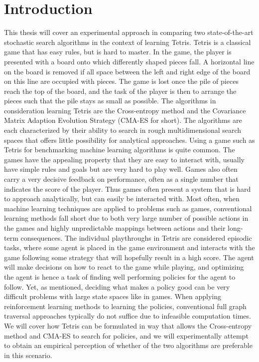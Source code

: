 \section{Introduction \label{sec:intro}}

This thesis will cover an experimental approach 
in comparing two state-of-the-art stochastic search
algorithms in the context of learning Tetris. 
Tetris is a classical game that has easy rules, but
is hard to master. In the game, the player is presented with
a board onto which differently shaped pieces fall. 
A horizontal line on the board is removed if all space between
the left and right edge of the board on this line are occupied with pieces.
The game is lost once the pile of pieces reach the top of the board,
and the task of the player is then to arrange the pieces such that
the pile stays as small as possible. 
The algorithms in consideration learning Tetris
are the Cross-entropy method and 
the Covariance Matrix Adaption Evolution Strategy (CMA-ES
for short). The algorithms are each characterized by their
ability to search in rough multidimensional 
search spaces that offers little possibility 
for analytical approaches.
Using a game such as Tetris for benchmarking machine learning
algorithms is quite common. The games have the appealing property 
that they are easy to interact with, usually have simple rules and 
goals but are very hard to play well. Games also often carry
a very decisive feedback on performance, often as a single number that 
indicates the score of the player. Thus games often present a system 
that is hard to approach analytically, but can easily be interacted with.
Most often, when machine learning
techniques are applied to problems such as games, conventional
learning methods fall short due to both  very large number of 
possible actions in the games and highly unpredictable mappings 
between actions and their long-term consequences. The individual playthroughs
in Tetris are considered episodic tasks, where some agent is placed
in the game environment and interacts with the game following some
strategy that will hopefully result in a high score. 
The agent will make decisions on how to react 
to the game while playing, and optimizing the agent is hence a task of
finding well performing policies for the agent to follow. Yet, as mentioned,
deciding what makes a policy good can be very difficult problems 
with large state spaces like in games. When applying reinforcement learning methods to learning
the policies, conventional full graph traversal approaches typically do not suffice 
due to infeasible computation times. We will cover how
Tetris can be formulated in way that allows  the Cross-entropy method 
and CMA-ES to search for policies, and we will experimentally 
attempt to obtain an empirical perception of whether of the two algorithms
are preferable in this scenario.







%


